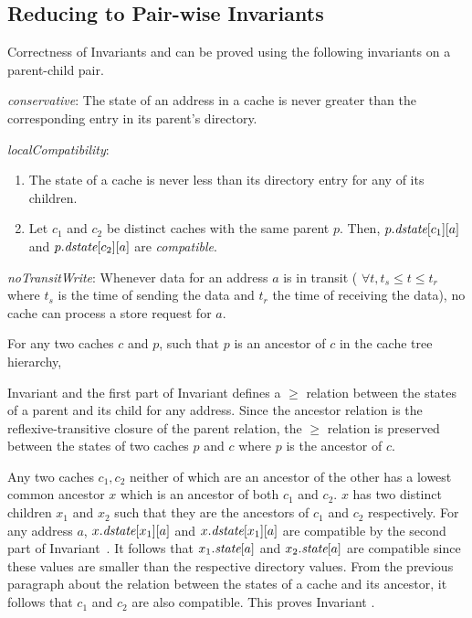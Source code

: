 \subsection{Reducing to Pair-wise Invariants}
\label{pairwise}

Correctness of Invariants  and  can be
proved using the following invariants on a parent-child pair.

\begin{inv}
\textit{conservative}: The state of an address in a cache is never greater than
the corresponding entry in its parent's directory.
\label{conservative}
\end{inv}

\begin{inv}
\textit{localCompatibility}:
\begin{enumerate}
\item The state of a cache is never less than its directory entry for any of
its children.
\item Let $c_1$ and $c_2$ be distinct caches with the same parent $p$. Then,
$p.\textit{dstate}[c_1][a]$ and $p.\textit{dstate}[c_2][a]$ are \textit{compatible}.
\end{enumerate}
\label{localCompatibility}
\end{inv}

\begin{inv}
\textit{noTransitWrite}: Whenever data for an address $a$ is in transit (\ie{}
$\forall t, t_s \le t \le t_r$ where $t_s$ is the time of sending the data and
$t_r$ the time of receiving the data), no cache can process a store request for
$a$.
\label{noTransitWrite}
\end{inv}

For any two caches $c$ and $p$, such that $p$ is an ancestor of $c$ in
the cache tree hierarchy,

Invariant  and the first part of Invariant
 defines a $\ge$ relation between the states of a
parent and its child for any address.  Since the ancestor relation is the
reflexive-transitive closure of the parent relation, the $\ge$ relation is
preserved between the states of two caches $p$ and $c$ where $p$ is the
ancestor of $c$.

Any two caches $c_1, c_2$ neither of which are an ancestor of the other has a
lowest common ancestor $x$ which is an ancestor of both $c_1$ and $c_2$. $x$
has two distinct children $x_1$ and $x_2$ such that they are the ancestors of
$c_1$ and $c_2$ respectively. For any address $a$, $x.\textit{dstate}[x_1][a]$ and
$x.\textit{dstate}[x_1][a]$ are compatible by the second part of
Invariant~. It follows that $x_1.\textit{state}[a]$ and
$x_2.\textit{state}[a]$ are compatible since these values are smaller than the
respective directory values.  From the previous paragraph about the relation
between the states of a cache and its ancestor, it follows that $c_1$ and $c_2$
are also compatible. This proves Invariant .

